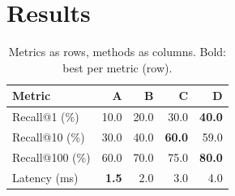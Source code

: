 \documentclass{article}
\begin{document}
\section{Results}
\begin{table}[h]\centering\caption{Metrics as rows, methods as columns. Bold: best per metric (row).}
\begin{tabular}{lrrrr}
\toprule
Metric & A & B & C & D \\
\midrule
Recall@1 (\%) & 10.0 & 20.0 & 30.0 & \textbf{40.0} \\
Recall@10 (\%) & 30.0 & 40.0 & \textbf{60.0} & 59.0 \\
Recall@100 (\%) & 60.0 & 70.0 & 75.0 & \textbf{80.0} \\
Latency (ms) & \textbf{1.5} & 2.0 & 3.0 & 4.0 \\
\bottomrule
\end{tabular}\end{table}
\end{document}
